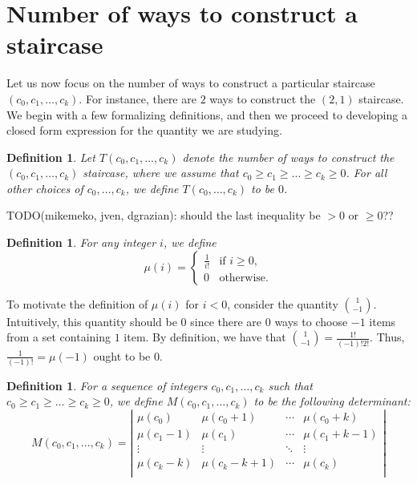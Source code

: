 \documentclass[12pt]{amsart}
\newtheorem{definition}[theorem]{Definition}
\newcommand{\ifact}{\mu}
\newcommand{\M}{M}
\newcommand{\newsection}[2]{
\section{#1 \label{#2}}
}
\begin{document}
\newsection{Number of ways to construct a staircase}{sec:numconstructions}
Let us now focus on the number of ways to construct a particular staircase $(c_0, c_1, \dots, c_k)$. For instance, there are $2$ ways to construct the $(2,1)$ staircase. We begin with a few formalizing definitions, and then we proceed to developing a closed form expression for the quantity we are studying.

\begin{definition}
Let $T(c_0, c_1, \dots, c_k)$ denote the number of ways to construct the $(c_0, c_1, \dots, c_k)$ staircase, where we assume that $c_0 \geq c_1 \geq \dots \geq c_k \geq 0$. For all other choices of $c_0, \dots, c_k$, we define $T(c_0, \dots, c_k)$ to be $0$.
\end{definition}

TODO(mikemeko, jven, dgrazian): should the last inequality be $> 0$ or $\geq 0$??

\begin{definition}
For any integer $i$, we define
$$
\ifact(i) = 
\begin{cases}
\frac{1}{i!} & \text{if } i \geq 0, \\
0 & \text{otherwise.}
\end{cases}
$$
\end{definition}

To motivate the definition of $\ifact(i)$ for $i < 0$, consider the quantity $\binom{1}{-1}$. Intuitively, this quantity should be $0$ since there are $0$ ways to choose $-1$ items from a set containing $1$ item. By definition, we have that $\binom{1}{-1} = \frac{1!}{(-1)!2!}$. Thus, $\frac{1}{(-1)!} = \ifact(-1)$ ought to be $0$.

\begin{definition}
For a sequence of integers $c_0, c_1, \dots, c_k$ such that $c_0 \geq c_1 \geq \dots \geq c_k \geq 0$, we define $\M(c_0, c_1, \dots, c_k)$ to be the following determinant:
$$
\M(c_0, c_1, \dots, c_k) = \left|
\begin{matrix}
\ifact(c_0) & \ifact(c_0+1) & \cdots & \ifact(c_0+k) \\
\ifact(c_1-1) & \ifact(c_1) & \cdots & \ifact(c_1+k-1) \\
\vdots & \vdots & \ddots & \vdots \\
\ifact(c_k-k) & \ifact(c_k-k+1) & \cdots & \ifact(c_k) \\
\end{matrix} \right|
$$
\end{definition}
\end{document}
